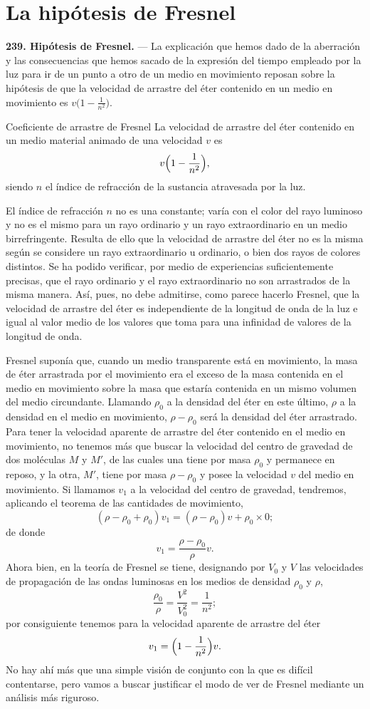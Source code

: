 \section{La hipótesis de Fresnel}

\noindent\textbf{239. Hipótesis de Fresnel.} — La explicación que hemos
dado de la aberración y las consecuencias que hemos sacado de la expresión
del tiempo empleado por la luz para ir de un punto a otro de un medio en
movimiento reposan sobre la hipótesis de que la velocidad de arrastre del
éter contenido en un medio en movimiento es
$v\bigl(1-\tfrac{1}{n^2}\bigr)$.

\begin{enunciado}{Coeficiente de arrastre de Fresnel}
La velocidad de arrastre del éter contenido en un medio material animado
de una velocidad $v$ es
\[
v\Bigl(1-\frac{1}{n^2}\Bigr),
\]
siendo $n$ el índice de refracción de la sustancia atravesada por la luz.
\end{enunciado}

El índice de refracción $n$ no es una constante; varía con el color del
rayo luminoso y no es el mismo para un rayo ordinario y un rayo
extraordinario en un medio birrefringente. Resulta de ello que la velocidad
de arrastre del éter no es la misma según se considere un rayo
extraordinario u ordinario, o bien dos rayos de colores distintos. Se ha
podido verificar, por medio de experiencias suficientemente precisas, que
el rayo ordinario y el rayo extraordinario no son arrastrados de la misma
manera. Así, pues, no debe admitirse, como parece hacerlo Fresnel, que la
velocidad de arrastre del éter es independiente de la longitud de onda de
la luz e igual al valor medio de los valores que toma para una infinidad de
valores de la longitud de onda.

Fresnel suponía que, cuando un medio transparente está en movimiento, la
masa de éter arrastrada por el movimiento era el exceso de la masa
contenida en el medio en movimiento sobre la masa que estaría contenida en
un mismo volumen del medio circundante. Llamando $\rho_0$ a la densidad del
éter en este último, $\rho$ a la densidad en el medio en movimiento,
$\rho-\rho_0$ será la densidad del éter arrastrado. Para tener la velocidad
aparente de arrastre del éter contenido en el medio en movimiento, no
tenemos más que buscar la velocidad del centro de gravedad de dos
moléculas $M$ y $M'$, de las cuales una tiene por masa $\rho_0$ y permanece
en reposo, y la otra, $M'$, tiene por masa $\rho-\rho_0$ y posee la
velocidad $v$ del medio en movimiento. Si llamamos $v_1$ a la velocidad del
centro de gravedad, tendremos, aplicando el teorema de las cantidades de
movimiento,
\[
(\rho-\rho_0+\rho_0)v_1 = (\rho-\rho_0)v + \rho_0\times 0;
\]
de donde
\[
v_1 = \frac{\rho-\rho_0}{\rho}v.
\]
Ahora bien, en la teoría de Fresnel se tiene, designando por $V_0$ y $V$
las velocidades de propagación de las ondas luminosas en los medios de
densidad $\rho_0$ y $\rho$,
\[
\frac{\rho_0}{\rho} = \frac{V^2}{V_0^2} = \frac{1}{n^2};
\]
por consiguiente tenemos para la velocidad aparente de arrastre del éter
\[
v_1 = \Bigl(1-\frac{1}{n^2}\Bigr)v.
\]
No hay ahí más que una simple visión de conjunto con la que es difícil
contentarse, pero vamos a buscar justificar el modo de ver de Fresnel
mediante un análisis más riguroso.

